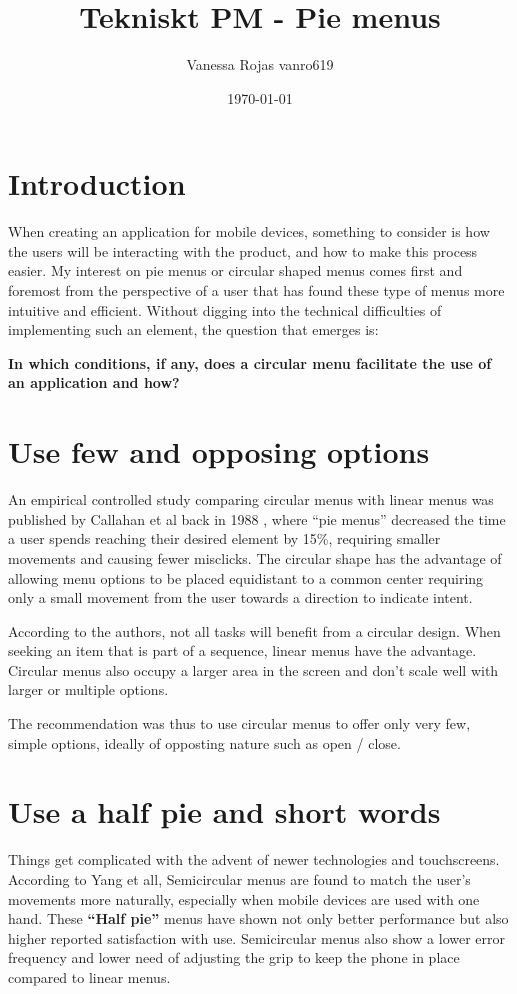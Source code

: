 \documentclass{article}
\title{Tekniskt PM - Pie menus}
\author{Vanessa Rojas vanro619}
\date{\today}
\begin{document}
\maketitle
\section{Introduction}
When creating an application for mobile devices, something to consider is how the users will be interacting with the product, and how to make this process easier. My interest on pie menus or circular shaped menus comes first and foremost from the perspective of a user that has found these type of menus more intuitive and efficient. Without digging into the technical difficulties of implementing such an element, the question that emerges is:


\textbf{In which conditions, if any, does a circular menu facilitate the use of an application and how?}


\section{Use few and opposing options}

An empirical controlled study comparing circular menus with linear menus was published by Callahan et al back in 1988 \cite{Callahan:1988:ECP:57167.57182}, where ``pie menus'' decreased the time a user spends reaching their desired element by 15\%, requiring smaller movements and causing fewer misclicks.  The circular shape has the advantage of allowing menu options to be placed equidistant to a common center requiring only a small movement from the user towards a direction to indicate intent.

According to the authors, not all tasks will benefit from a circular design. When seeking an item that is part of a sequence, linear menus have the advantage. Circular menus also occupy a larger area in the screen and don't scale well with larger or multiple options. 

The recommendation was thus to use circular menus to offer only very few, simple options, ideally of opposting nature such as open / close.

\section{Use a half pie and short words}

Things get complicated with the advent of newer technologies and touchscreens. According to Yang et all\cite{doi:10.1080/0144929X.2017.1312529}, Semicircular menus are found to match the user's movements more naturally, especially when mobile devices are used with one hand.  These \textbf{``Half pie''} menus have shown not only better performance but also higher reported satisfaction with use. Semicircular menus also show a lower error frequency and lower need of adjusting the grip to keep the phone in place compared to linear menus.
\end{document}
